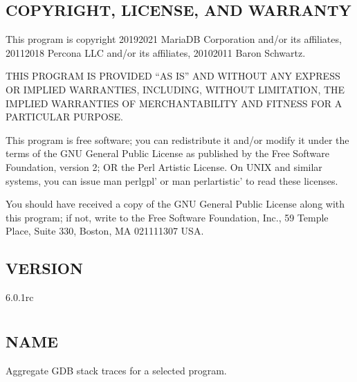\documentclass[letterpaper,10pt,english]{sphinxmanual}
\begin{document}
\section{COPYRIGHT, LICENSE, AND WARRANTY}
\label{\detokenize{mariadb-schema-change:copyright-license-and-warranty}}
\sphinxAtStartPar
This program is copyright 2019\sphinxhyphen{}2021 MariaDB Corporation and/or its affiliates,
2011\sphinxhyphen{}2018 Percona LLC and/or its affiliates, 2010\sphinxhyphen{}2011 Baron Schwartz.

\sphinxAtStartPar
THIS PROGRAM IS PROVIDED “AS IS” AND WITHOUT ANY EXPRESS OR IMPLIED
WARRANTIES, INCLUDING, WITHOUT LIMITATION, THE IMPLIED WARRANTIES OF
MERCHANTABILITY AND FITNESS FOR A PARTICULAR PURPOSE.

\sphinxAtStartPar
This program is free software; you can redistribute it and/or modify it under
the terms of the GNU General Public License as published by the Free Software
Foundation, version 2; OR the Perl Artistic License.  On UNIX and similar
systems, you can issue \textasciigrave{}man perlgpl’ or \textasciigrave{}man perlartistic’ to read these
licenses.

\sphinxAtStartPar
You should have received a copy of the GNU General Public License along with
this program; if not, write to the Free Software Foundation, Inc., 59 Temple
Place, Suite 330, Boston, MA  02111\sphinxhyphen{}1307  USA.


\section{VERSION}
\label{\detokenize{mariadb-schema-change:version}}
\sphinxAtStartPar
{} 6.0.1rc


\chapter{}
\label{\detokenize{mariadb-stacktrace:mariadb-stacktrace}}\label{\detokenize{mariadb-stacktrace::doc}}

\section{NAME}
\label{\detokenize{mariadb-stacktrace:name}}
\sphinxAtStartPar
{} \sphinxhyphen{} Aggregate GDB stack traces for a selected program.
\end{document}
